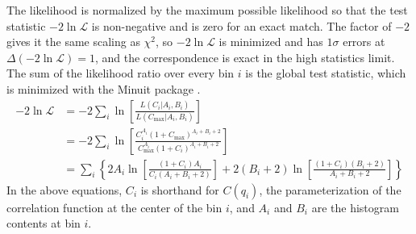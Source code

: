 The likelihood is normalized by the maximum possible likelihood so that the test statistic $-2\ln \mathcal{L}$ is non-negative and is zero for an exact match.
The factor of $-2$ gives it the same scaling as $\chi^2$, so $-2\ln\mathcal{L}$ is minimized and has $1\sigma$ errors at $\Delta (-2\ln\mathcal{L}) = 1$, and the correspondence is exact in the high statistics limit.
The sum of the likelihood ratio over every bin $i$ is the global test statistic, which is minimized with the Minuit package \cite{James:1975dr}.
\begin{equation}
  \begin{split}
-2\ln \mathcal{L} &= -2 \sum_i \ln \left[ \frac{L(C_i|A_i,B_i)}{L(C_{\textrm{max}}|A_i,B_i)} \right]\\
&= -2 \sum_i \ln \left[ \frac{C_i^{A_i} (1+C_{\textrm{max}})^{A_i+B_i+2}}{C_{\textrm{max}}^{A_i} (1+C_i)^{A_i+B_i+2}} \right]\\
&= \sum_i \left\{ 2 A_i \ln \left[\frac{(1+C_i)A_i}{C_i (A_i+B_i+2)} \right] + 2(B_i+2) \ln \left[ \frac{(1+C_i)(B_i+2)}{A_i+B_i+2} \right] \right\}
  \end{split}
\end{equation}
In the above equations, $C_i$ is shorthand for $C(q_i)$, the parameterization of the correlation function at the center of the bin $i$, and $A_i$ and $B_i$ are the histogram contents at bin $i$.

